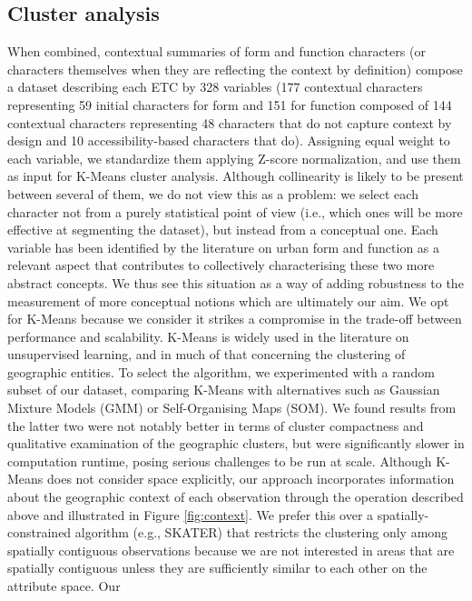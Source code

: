 \documentclass[fleqn,10pt]{wlscirep}
\begin{document}
\subsection*{Cluster analysis}
When combined, contextual summaries of form and function characters (or characters
themselves when they are reflecting the context by definition) compose a dataset
describing each ETC by 328 variables (177 contextual characters representing 59 initial
characters for form and 151 for function composed of 144 contextual characters
representing 48 characters that do not capture context by design and 10
accessibility-based characters that do).
Assigning equal weight to each variable, we standardize them applying
Z-score normalization, and use them as input for K-Means cluster analysis.
Although collinearity is likely to be present between several of them, we do
not view this as a problem: we select each character not from a purely
statistical point of view (i.e., which ones will be more effective at
segmenting the dataset), but instead from a conceptual one. Each variable has
been identified by the literature on urban form and function as a relevant
aspect that contributes to collectively characterising these two more abstract
concepts. We thus see this situation as a way of adding robustness to the
measurement of more conceptual notions which are ultimately our aim.
We opt for K-Means because we consider it strikes a compromise in
the trade-off between performance and scalability. K-Means is widely used in the literature on
unsupervised learning, and in much of that concerning the clustering of
geographic entities\cite{webber2018predictive}.
To select the algorithm, we experimented with a random subset of our dataset,
comparing K-Means with alternatives such as Gaussian
Mixture Models (GMM) or Self-Organising Maps (SOM). We found results from the
latter two were not notably better in terms of cluster compactness and qualitative examination
of the geographic clusters, but were significantly slower in computation
runtime, posing serious challenges to be run at scale.
Although K-Means does not consider space explicitly, our approach incorporates
information about the geographic context of each observation through the
operation described above and illustrated in Figure \ref{fig:context}. We
prefer this over a spatially-constrained algorithm (e.g.,
SKATER\cite{lage2001minimal}) that restricts the clustering only among spatially contiguous observations
because we are not interested in areas that are spatially contiguous unless
they are sufficiently similar to each other on the attribute space. Our
\end{document}

